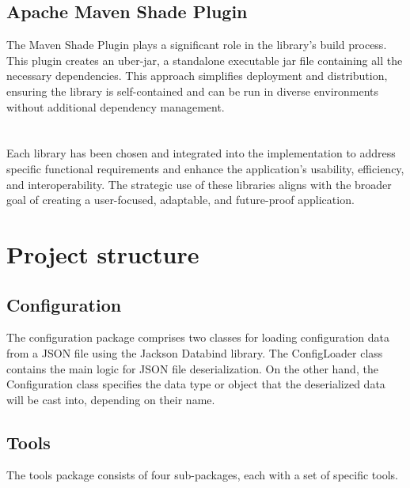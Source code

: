 \documentclass[
  digital,     %
  oneside,     %
  nosansbold,  %
  nocolorbold, %
  lof,         %
  lot,         %
]{fithesis4}
\begin{document}
\subsection{Apache Maven Shade Plugin}
The Maven Shade Plugin \cite{maven-shade} plays a significant role in the library's build process. This plugin creates an uber-jar, a standalone executable jar file containing all the necessary dependencies. This approach simplifies deployment and distribution, ensuring the library is self-contained and can be run in diverse environments without additional dependency management.
\section*{}
Each library has been chosen and integrated into the implementation to address specific functional requirements and enhance the application's usability, efficiency, and interoperability. The strategic use of these libraries aligns with the broader goal of creating a user-focused, adaptable, and future-proof application.

\section{Project structure}
\subsection{Configuration}
\vskip 0.35cm

The configuration package comprises two classes for loading configuration data from a JSON file using the Jackson Databind library. The ConfigLoader class contains the main logic for JSON file deserialization. On the other hand, the Configuration class specifies the data type or object that the deserialized data will be cast into, depending on their name.

\subsection{Tools}
\vskip 0.35cm

The tools package consists of four sub-packages, each with a set of specific tools. 
\end{document}
